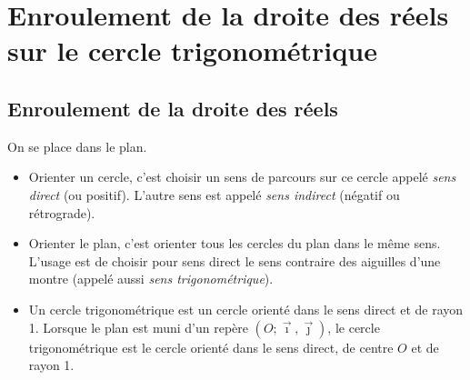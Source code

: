 \chapter{Enroulement de la droite des r\'eels sur le cercle trigonom\'etrique} \label{enroulement}
\minitoc

\fancyhead{} %
\fancyhead[LE,RO]{\footnotesize \em \rightmark} %

    \fancyfoot{}
    \fancyfoot[LE,RO]{\textbf{\thepage}}


\section{Enroulement de la droite des réels}

\begin{definition}
On se place dans le plan.
\begin{itemize}
	\item Orienter un cercle, c'est choisir un sens de parcours sur ce cercle appelé \emph{sens direct} (ou positif). L'autre sens est appelé \emph{sens indirect} (négatif ou rétrograde).
	\item Orienter le plan, c'est orienter tous les cercles du plan dans le même sens. L'usage est de choisir pour sens direct le sens contraire des aiguilles d'une montre (appelé aussi \emph{sens trigonométrique}).
	\item Un cercle trigonométrique est un cercle orienté dans le sens direct et de rayon 1. Lorsque le plan est muni d'un repère $\left(O;\vec{\imath},\vec{\jmath}\right)$, le cercle trigonométrique est le cercle orienté dans le sens direct, de centre $O$ et de rayon 1.
\end{itemize}
\end{definition}


